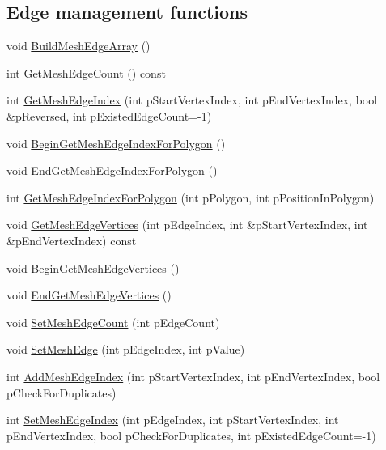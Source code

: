 \subsection*{Edge management functions}
\begin{DoxyCompactItemize}
\item 
void \hyperlink{class_fbx_mesh_af1c0926731661cbdc52ec90032462ef2}{Build\+Mesh\+Edge\+Array} ()
\item 
int \hyperlink{class_fbx_mesh_a74e9f89067b21a959c68d44bea963608}{Get\+Mesh\+Edge\+Count} () const
\item 
int \hyperlink{class_fbx_mesh_aa13c433e2d1733a37a74de640d22a13f}{Get\+Mesh\+Edge\+Index} (int p\+Start\+Vertex\+Index, int p\+End\+Vertex\+Index, bool \&p\+Reversed, int p\+Existed\+Edge\+Count=-\/1)
\item 
void \hyperlink{class_fbx_mesh_a68a92dfeaad020596eb730c4bba6df26}{Begin\+Get\+Mesh\+Edge\+Index\+For\+Polygon} ()
\item 
void \hyperlink{class_fbx_mesh_accc59f6a71fd42bdf4d547c14f98bd90}{End\+Get\+Mesh\+Edge\+Index\+For\+Polygon} ()
\item 
int \hyperlink{class_fbx_mesh_adefa62c43b2d97d5ce122d58542f9cd3}{Get\+Mesh\+Edge\+Index\+For\+Polygon} (int p\+Polygon, int p\+Position\+In\+Polygon)
\item 
void \hyperlink{class_fbx_mesh_a326d8c17181238499d628ea719531fa3}{Get\+Mesh\+Edge\+Vertices} (int p\+Edge\+Index, int \&p\+Start\+Vertex\+Index, int \&p\+End\+Vertex\+Index) const
\item 
void \hyperlink{class_fbx_mesh_a7eed368fb6a1e11dc2b1e69271e46252}{Begin\+Get\+Mesh\+Edge\+Vertices} ()
\item 
void \hyperlink{class_fbx_mesh_ad78469b758835d9ffda31a85df03f35c}{End\+Get\+Mesh\+Edge\+Vertices} ()
\item 
void \hyperlink{class_fbx_mesh_a8a0ca6b1202ad971d3f504e801bf53ac}{Set\+Mesh\+Edge\+Count} (int p\+Edge\+Count)
\item 
void \hyperlink{class_fbx_mesh_a0a1288c874a40992ae4db6c0905ca2c0}{Set\+Mesh\+Edge} (int p\+Edge\+Index, int p\+Value)
\item 
int \hyperlink{class_fbx_mesh_a16e82b52c2485fcdd2456e1a7e8da197}{Add\+Mesh\+Edge\+Index} (int p\+Start\+Vertex\+Index, int p\+End\+Vertex\+Index, bool p\+Check\+For\+Duplicates)
\item 
int \hyperlink{class_fbx_mesh_aa5b7cc2518716a2718aa4dc74c028bfa}{Set\+Mesh\+Edge\+Index} (int p\+Edge\+Index, int p\+Start\+Vertex\+Index, int p\+End\+Vertex\+Index, bool p\+Check\+For\+Duplicates, int p\+Existed\+Edge\+Count=-\/1)

\end{DoxyCompactItemize}
